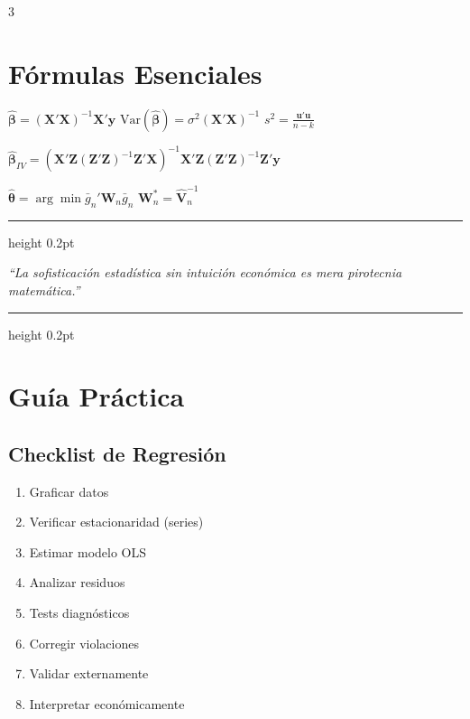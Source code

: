 \documentclass[9pt, spanish, twoside]{article}
\newcommand{\techfont}{\fontfamily{phv}\selectfont}
\newcommand{\vogueQuote}[1]{
    \begin{center}
        \vspace{6pt}
        {\color{Champagne}\hrule height 0.2pt}
        \vspace{5pt}
        {\fontsize{11}{14} \selectfont \itshape \color{VogueBlack} ``#1''}
        \vspace{5pt}
        {\color{Champagne}\hrule height 0.2pt}
        \vspace{6pt}
    \end{center}
}
\begin{document}
\begin{multicols*}{3}
\section{Fórmulas Esenciales}
\begin{tcolorbox}[colback=NASAClassic!10, colframe=NASAClassic, arc=0pt, boxrule=0.4pt, title=\techfont \tiny OLS, fonttitle=\tiny\bfseries]
\scriptsize
$\hat{\boldsymbol{\beta}} = (\mathbf{X}'\mathbf{X})^{-1}\mathbf{X}'\mathbf{y}$
$\text{Var}(\hat{\boldsymbol{\beta}}) = \sigma^2(\mathbf{X}'\mathbf{X})^{-1}$
$s^2 = \frac{\mathbf{u}'\mathbf{u}}{n-k}$
\end{tcolorbox}

\begin{tcolorbox}[colback=Champagne!15, colframe=Champagne, arc=0pt, boxrule=0.4pt, title=\techfont \tiny IV/2SLS, fonttitle=\tiny\bfseries]
\scriptsize
$\hat{\boldsymbol{\beta}}_{IV} = (\mathbf{X}'\mathbf{Z}(\mathbf{Z}'\mathbf{Z})^{-1}\mathbf{Z}'\mathbf{X})^{-1}\mathbf{X}'\mathbf{Z}(\mathbf{Z}'\mathbf{Z})^{-1}\mathbf{Z}'\mathbf{y}$
\end{tcolorbox}

\begin{tcolorbox}[colback=CriticalRed!10, colframe=CriticalRed, arc=0pt, boxrule=0.4pt, title=\techfont \tiny GMM, fonttitle=\tiny\bfseries]
\scriptsize
$\hat{\boldsymbol{\theta}} = \arg\min \bar{g}_n'\mathbf{W}_n\bar{g}_n$
$\mathbf{W}_n^* = \hat{\mathbf{V}}_n^{-1}$
\end{tcolorbox}

\vogueQuote{La sofisticación estadística sin intuición económica es mera pirotecnia matemática.}

\section{Guía Práctica}
\subsection{Checklist de Regresión}
\begin{enumerate}[leftmargin=8pt, itemsep=1pt, topsep=2pt]
    \item[$\square$] Graficar datos
    \item[$\square$] Verificar estacionaridad (series)
    \item[$\square$] Estimar modelo OLS
    \item[$\square$] Analizar residuos
    \item[$\square$] Tests diagnósticos
    \item[$\square$] Corregir violaciones
    \item[$\square$] Validar externamente
    \item[$\square$] Interpretar económicamente
\end{enumerate}


\end{multicols*}
\end{document}

